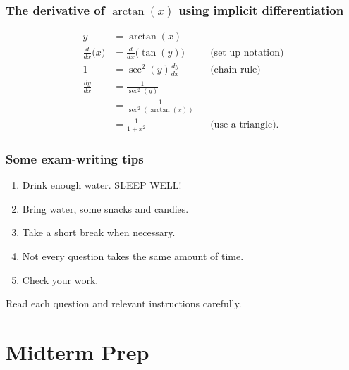 \documentclass[aspectratio=169, 12pt]{beamer}
\begin{document}
\begin{frame}
  \frametitle{The derivative of \(\arctan(x)\) using implicit differentiation}
  
  \footnotesize
  \begin{align*}
    y &= \arctan(x) \\[0.8ex]
    \frac{d}{dx} \big(x\big) &= \frac{d}{dx} \big(\tan(y)\big) && \text{(set up notation)}\\[0.8ex]
    1 &= \sec^{2}(y) \frac{dy}{dx} && \text{(chain rule)} \\[0.8ex]
    \frac{dy}{dx} &= \frac{1}{\sec^{2}(y)} \\[0.8ex]
                  &= \frac{1}{\sec^{2}(\arctan(x))} \\[0.8ex]
                  &= \frac{1}{1 + x^{2}} && \text{(use a triangle)}.
  \end{align*}
\end{frame}

\begin{frame}
  \frametitle{Some exam-writing tips}

  \begin{enumerate}
    \item Drink enough water. SLEEP WELL!

    \item Bring water, some snacks and candies.

    \item Take a short break when necessary.

    \item Not every question takes the same amount of time.

    \item Check your work.
  \end{enumerate}

  \faStar{} Read each question and relevant instructions carefully. 
\end{frame}

\section{Midterm Prep}


\end{document}
